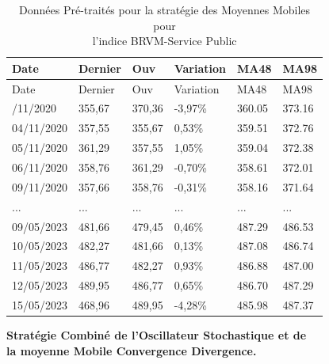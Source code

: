\hypertarget{tab:multirow}{}
\begin{longtable}[]{@{}llllll@{}}
\caption{Données Pré-traités pour la stratégie des Moyennes Mobiles
pour\\
l'indice BRVM-Service Public}\tabularnewline
\toprule\noalign{}
Date & Dernier & Ouv & Variation & MA48 & MA98 \\
\midrule\noalign{}
\endfirsthead
\toprule\noalign{}
Date & Dernier & Ouv & Variation & MA48 & MA98 \\
\midrule\noalign{}
\endhead
\bottomrule\noalign{}
\endlastfoot
03/11/2020 & 355,67 & 370,36 & -3,97\% & 360.05 & 373.16 \\
04/11/2020 & 357,55 & 355,67 & 0,53\% & 359.51 & 372.76 \\
05/11/2020 & 361,29 & 357,55 & 1,05\% & 359.04 & 372.38 \\
06/11/2020 & 358,76 & 361,29 & -0,70\% & 358.61 & 372.01 \\
09/11/2020 & 357,66 & 358,76 & -0,31\% & 358.16 & 371.64 \\
... & ... & ... & ... & ... & ... \\
09/05/2023 & 481,66 & 479,45 & 0,46\% & 487.29 & 486.53 \\
10/05/2023 & 482,27 & 481,66 & 0,13\% & 487.08 & 486.74 \\
11/05/2023 & 486,77 & 482,27 & 0,93\% & 486.88 & 487.00 \\
12/05/2023 & 489,95 & 486,77 & 0,65\% & 486.70 & 487.29 \\
15/05/2023 & 468,96 & 489,95 & -4,28\% & 485.98 & 487.37 \\
\end{longtable}

\textbf{Stratégie Combiné de l'Oscillateur Stochastique et de}\\
\textbf{la moyenne Mobile Convergence Divergence.}

